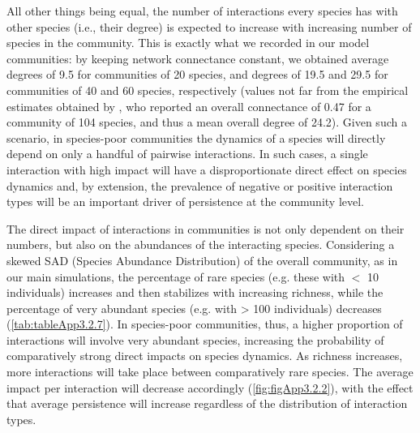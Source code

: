 All other things being equal, the number of interactions every species has with other species (i.e., their degree) is expected to increase with increasing number of species in the community. This is exactly what we recorded in our model communities: by keeping network connectance constant, we obtained average degrees of 9.5 for communities of 20 species, and degrees of 19.5 and 29.5 for communities of 40 and 60 species, respectively (values not far from the empirical estimates obtained by \cite{Kefi2015}, who reported an overall connectance of 0.47 for a community of 104 species, and thus a mean overall degree of 24.2). Given such a scenario, in species-poor communities the dynamics of a species will directly depend on only a handful of pairwise interactions. In such cases, a single interaction with high impact will have a disproportionate direct effect on species dynamics and, by extension, the prevalence of negative or positive interaction types will be an important driver of persistence at the community level.

The direct impact of interactions in communities is not only dependent on their numbers, but also on the abundances of the interacting species. Considering a skewed SAD (Species Abundance Distribution) of the overall community, as in our main simulations, the percentage of rare species (e.g. these with $<$ 10 individuals) increases and then stabilizes with increasing richness, while the percentage of very abundant species (e.g. with > 100 individuals) decreases (\cref{tab:tableApp3.2.7}). In species-poor communities, thus, a higher proportion of interactions will involve very abundant species, increasing the probability of comparatively strong direct impacts on species dynamics. As richness increases, more interactions will take place between comparatively rare species. The average impact per interaction will decrease accordingly (\cref{fig:figApp3.2.2}), with the effect that average persistence will increase regardless of the distribution of interaction types.

